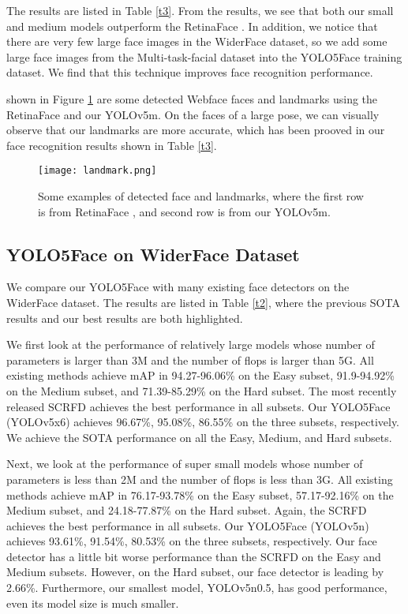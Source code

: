 \documentclass[conference]{IEEEtran}
\begin{document}
The results are listed in Table \ref{t3}. From the results, we see that both our small and medium models outperform the RetinaFace \cite{RetinaFace}. In addition, we notice that there are very few large face images in the WiderFace dataset, so we add some large face images from the Multi-task-facial dataset \cite{Multi-task-facial} into the YOLO5Face training dataset. We find that this technique improves face recognition performance.  

shown in Figure \ref{landmark} are some detected Webface \cite{webface} faces and landmarks using the RetinaFace \cite{RetinaFace} and our YOLOv5m. On the faces of a large pose, we can visually observe that our landmarks are more accurate, which has been prooved in our face recognition results shown in Table \ref{t3}.  

\begin{figure}[bt]
    \centering
    \texttt{[image: landmark.png]}
    \caption{Some examples of detected face and landmarks, where the first row is from RetinaFace \cite{RetinaFace}, and second row is from our YOLOv5m.}
    \label{landmark}
\end{figure}

\subsection{YOLO5Face on WiderFace Dataset}

We compare our YOLO5Face with many existing face detectors on the WiderFace dataset. The results are listed in Table \ref{t2}, where the previous SOTA results and our best results are both highlighted.  

We first look at the performance of relatively large models whose number of parameters is larger than 3M and the number of flops is larger than 5G.  All existing methods achieve mAP in 94.27-96.06\% on the Easy subset, 91.9-94.92\% on the Medium subset, and 71.39-85.29\% on the Hard subset. The most recently released SCRFD \cite{SCRFD} achieves the best performance in all subsets. Our YOLO5Face (YOLOv5x6) achieves 96.67\%, 95.08\%, 86.55\% on the three subsets, respectively. We achieve the SOTA performance on all the Easy, Medium, and Hard subsets.  

Next, we look at the performance of super small models whose number of parameters is less than 2M and the number of flops is less than 3G. All existing methods achieve mAP in 76.17-93.78\% on the Easy subset, 57.17-92.16\% on the Medium subset, and 24.18-77.87\% on the Hard subset. Again, the SCRFD \cite{SCRFD} achieves the best performance in all subsets. Our YOLO5Face (YOLOv5n) achieves 93.61\%, 91.54\%, 80.53\% on the three subsets, respectively. Our face detector has a little bit worse performance than the SCRFD \cite{SCRFD} on the Easy and Medium subsets. However, on the Hard subset, our face detector is leading by 2.66\%. Furthermore, our smallest model, YOLOv5n0.5, has good performance, even its model size is much smaller.   
\end{document}

